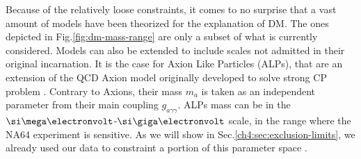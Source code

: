 Because of the relatively loose constraints, it comes to no surprise that a vast amount of models have been theorized for the explanation of DM. The ones depicted in Fig.\ref{fig:dm-mass-range} are only a subset of what is currently considered. Models can also be extended to include scales not admitted in their original incarnation. It is the case for Axion Like Particles (ALPs), that are an extension of the QCD Axion model originally developed to solve strong CP problem \cite{PhysRevD.16.1791}. Contrary to Axions, their mass $m_a$ is taken as an independent parameter from their main coupling $g_{a \gamma \gamma}$. ALPs mass can  be in the $\mev$-$\gev$ scale, in the range where the NA64 experiment is sensitive. As we will show in Sec.\ref{ch4:sec:exclusion-limits}, we already used our data to constraint a portion of this parameter space \cite{Banerjee:2020fue}.

